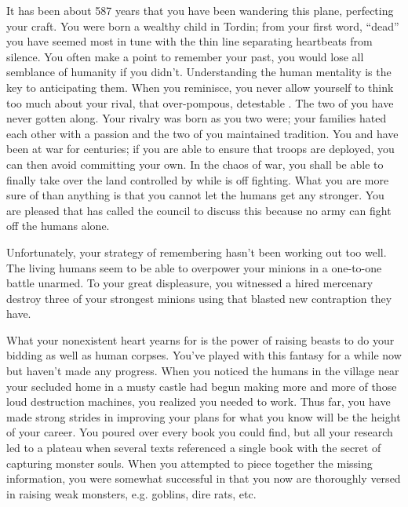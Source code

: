 \documentclass[char]{guildcamp2}
\begin{document}
\name{\cLich{}}



It has been about 587 years that you have been wandering this plane, perfecting your craft. You were born a wealthy child in Tordin; from your first word, ``dead'' you have seemed most in tune with the thin line separating heartbeats from silence. You often make a point to remember your past, you would lose all semblance of humanity if you didn't. Understanding the human mentality is the key to anticipating them. When you reminisce, you never allow yourself to think too much about your rival, that over-pompous, detestable \cVampire{\full}. The two of you have never gotten along. Your rivalry was born as you two were; your families hated each other with a passion and the two of you maintained tradition. You and \cVampire{\full} have been at war for centuries; if you are able to ensure that \cVampire{\their} troops are deployed, you can then avoid committing your own. In the chaos of war, you shall be able to finally take over the land controlled by \cVampire{\them} while \cVampire{\they} is off fighting. What you are more sure of than anything is that you cannot let the humans get any stronger. You are pleased that \cOnyx{} has called the council to discuss this because no army can fight off the humans alone.

Unfortunately, your strategy of remembering hasn't been working out too well. The living humans seem to be able to overpower your minions in a one-to-one battle unarmed. To your great displeasure, you witnessed a hired mercenary destroy three of your strongest minions using that blasted new contraption they have.

What your nonexistent heart yearns for is the power of raising beasts to do your bidding as well as human corpses. You've played with this fantasy for a while now but haven't made any progress. When you noticed the humans in the village near your secluded home in a musty castle had begun making more and more of those loud destruction machines, you realized you needed to work. Thus far, you have made strong strides in improving your plans for what you know will be the height of your career. You poured over every book you could find, but all your research led to a plateau when several texts referenced a single book with the secret of capturing monster souls. When you attempted to piece together the missing information, you were somewhat successful in that you now are thoroughly versed in raising weak monsters, e.g. goblins, dire rats, etc.  
\end{document}
